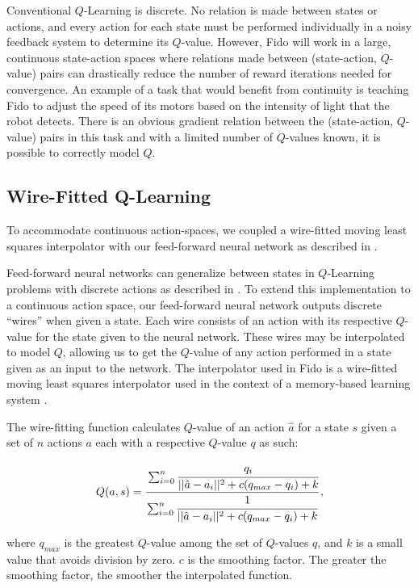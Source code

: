 Conventional $Q$-Learning is discrete. No relation is made between states or actions, and every action for each state must be performed individually in a noisy feedback system to determine its $Q$-value. However, Fido will work in a large, continuous state-action spaces where relations made between (state-action, $Q$-value) pairs can drastically reduce the number of reward iterations needed for convergence. An example of a task that would benefit from continuity is teaching Fido to adjust the speed of its motors based on the intensity of light that the robot detects. There is an obvious gradient relation between the (state-action, $Q$-value) pairs in this task and with a limited number of $Q$-values known, it is possible to correctly model $Q$.

\subsection{Wire-Fitted Q-Learning}

To accommodate continuous action-spaces, we coupled a wire-fitted moving least squares interpolator with our feed-forward neural network as described in \cite{gaskett}. 

Feed-forward neural networks can generalize between states in $Q$-Learning problems with discrete actions as described in \cite{rummery}. To extend this implementation to a continuous action space, our feed-forward neural network outputs discrete ``wires'' when given a state. Each wire consists of an action with its respective $Q$-value for the state given to the neural network. These wires may be interpolated to model $Q$, allowing us to get the $Q$-value of any action performed in a state given as an input to the network. The interpolator used in Fido is a wire-fitted moving least squares interpolator used in the context of a memory-based learning system \cite{baird}.

The wire-fitting function calculates $Q$-value of an action $\hat{a}$ for a state $s$ given a set of $n$ actions $a$ each with a respective $Q$-value $q$ as such:

\begin{equation}
	Q(a, s) = \cfrac{\sum_{i=0}^{n}\cfrac{q_i}{||\hat{a}-a_i||^2+c(q_{max}-q_i)+k}}{\sum_{i=0}^{n}\cfrac{1}{||\hat{a}-a_i||^2+c(q_{max}-q_i)+k}}
	\,,
\end{equation}

\noindent
where $q_{max}$ is the greatest $Q$-value among the set of $Q$-values $q$, and $k$ is a small value that avoids division by zero. $c$ is the smoothing factor. The greater the smoothing factor, the smoother the interpolated function.


